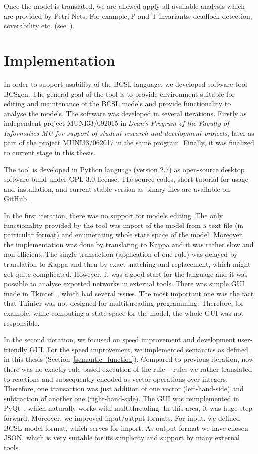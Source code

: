 \documentclass[12pt]{fithesis2}
\begin{document}
Once the model is translated, we are allowed apply all available analysis which are provided by Petri Nets. For example, P and T invariants, deadlock detection, coverability etc. (see~\cite{petri}).

\chapter{Implementation}

In order to support usability of the BCSL language, we developed software tool BCSgen. The general goal of the tool is to provide environment suitable for editing and maintenance of the BCSL models and provide functionality to analyse the models. The software was developed in several iterations. Firstly as independent project MUNI33/092015 in \emph{Dean's Program of the Faculty of Informatics MU for support of student research and development projects}, later as part of the project MUNI33/062017 in the same program. Finally, it was finalized to current stage in this thesis.

The tool is developed in Python language (version 2.7) as open-source desktop software build under GPL-3.0 license. The source codes, short tutorial for usage and installation, and current stable version as binary files are available on GitHub\footnotemark[1].

In the first iteration, there was no support for models editing. The only functionality provided by the tool was import of the model from a text file (in particular format) and enumerating whole state space of the model. Moreover, the implementation was done by translating to Kappa and it was rather slow and non-efficient. The single transaction (application of one rule) was delayed by translation to Kappa and then by exact matching and replacement, which might get quite complicated. However, it was a good start for the language and it was possible to analyse exported networks in external tools. There was simple GUI made in Tkinter~\cite{Tkinter}, which had several issues. The most important one was the fact that Tkinter was not designed for multithreading programming. Therefore, for example, while computing a state space for the model, the whole GUI was not responsible.

In the second iteration, we focused on speed improvement and development user-friendly GUI. For the speed improvement, we implemented semantics as defined in this thesis (Section~\ref{semantic_function}). Compared to previous iteration, now there was no exactly rule-based execution of the rule -- rules we rather translated to reactions and subsequently encoded as vector operations over integers. Therefore, one transaction was just addition of one vector (left-hand-side) and subtraction of another one (right-hand-side). The GUI was reimplemented in PyQt~\cite{summerfield2007rapid}, which naturally works with multithreading. In this area, it was huge step forward. Moreover, we improved input/output formats. For input, we defined BCSL model format, which serves for import. As output format we have chosen JSON, which is very suitable for its simplicity and support by many external tools.
\end{document}
